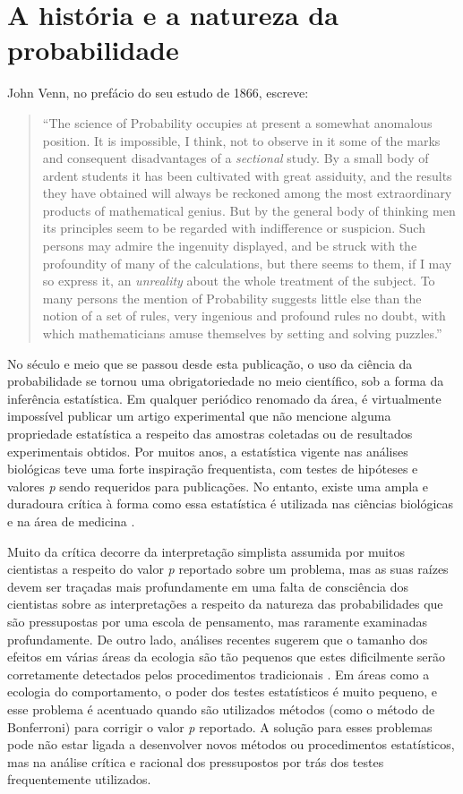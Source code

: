 \section{A história e a natureza da probabilidade}

John Venn, no prefácio do seu estudo de 1866, escreve:

\begin{quote}
``The science of Probability occupies at present a somewhat anomalous position. It is impossible, I think, not to observe
in it some of the marks and consequent disadvantages of a {\em sectional} study. By a small body of ardent students it
has been cultivated with great assiduity, and the results they have obtained will always be reckoned among the most 
extraordinary products of mathematical genius. But by the general body of thinking men its principles seem to be regarded
with indifference or suspicion. Such persons may admire the ingenuity displayed, and be struck with the profoundity
of many of the calculations, but there seems to them, if I may so express it, an {\em unreality} about the whole treatment
of the subject. To many persons the mention of Probability suggests little else than the notion of a set of rules, very
ingenious and profound rules no doubt, with which mathematicians amuse themselves by setting and solving puzzles.''
\citep{Venn1866}
\end{quote}

No século e meio que se passou desde esta publicação, o uso da ciência da probabilidade
se tornou uma obrigatoriedade no meio científico, sob a forma da inferência estatística.
Em qualquer periódico renomado da área, é virtualmente impossível publicar um artigo experimental que não 
mencione alguma propriedade
estatística a respeito das amostras coletadas ou de resultados experimentais obtidos. 
Por muitos anos, a estatística vigente nas análises biológicas teve uma
forte inspiração frequentista, com testes de hipóteses e valores {\em p} sendo requeridos para publicações. 
No entanto, existe uma ampla e duradoura crítica à forma como essa estatística é
utilizada nas ciências biológicas e na área de medicina \citep{Ioannidis05, Burnham11, Barber14, Gardner86}.

Muito da crítica decorre da interpretação
simplista assumida por muitos cientistas a respeito do valor {\em p} reportado sobre um problema, mas as suas raízes devem
ser traçadas mais profundamente em uma falta de consciência dos cientistas sobre as interpretações a respeito da natureza
das probabilidades que são pressupostas por uma escola de pensamento, mas raramente examinadas profundamente. 
De outro lado, análises recentes sugerem que o tamanho dos efeitos em várias áreas da ecologia são tão pequenos que estes
dificilmente serão corretamente detectados pelos procedimentos tradicionais \citep{Jennions03}. Em áreas como a ecologia do
comportamento, o poder dos testes estatísticos é muito pequeno, e esse problema é acentuado quando são utilizados métodos
(como o método de Bonferroni) para corrigir o valor {\em p} reportado. A solução para esses problemas pode não estar ligada
a desenvolver novos métodos ou procedimentos estatísticos, mas na análise crítica e racional dos pressupostos por trás
dos testes frequentemente utilizados.

